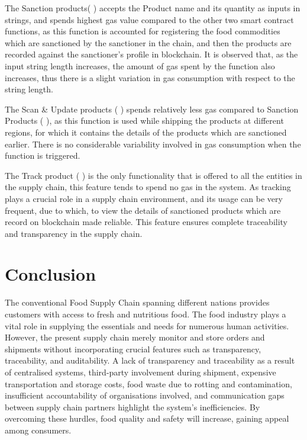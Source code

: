 \documentclass[12pt,a4paper,twocolumn,fleqn]{article}
\begin{document}
The Sanction products( ) accepts the Product name and its quantity as inputs in strings, and spends highest gas value compared to the other two smart contract functions, as this function is accounted for registering the food commodities which are sanctioned by the sanctioner in the chain,  and then the products are recorded against the sanctioner’s profile in blockchain. It is observed that, as the input string length increases, the amount of gas spent by the function also increases, thus there is a slight variation in gas consumption with respect to the string length. 

The Scan \& Update products ( ) spends relatively less gas compared to Sanction Products ( ), as this function is used while shipping the products at different regions, for which it contains the details of the products which are sanctioned earlier. There is no considerable variability involved in gas consumption when the function is triggered.

The Track product ( ) is the only functionality that is offered to all the entities in the supply chain, this feature tends to spend no gas in the system. As tracking plays a crucial role in a supply chain environment, and its usage can be very frequent, due to which, to view the details of sanctioned products which are record on blockchain made reliable. This feature ensures complete traceability and transparency in the supply chain.
\newpage
  \pagestyle{fancy}
  \thispagestyle{empty}
  \thispagestyle{plain}
  \fancyhf{}
  \chead{}
  \renewcommand{\headrulewidth}{0.4pt}%
\renewcommand{\footrulewidth}{0.4pt}%
\normalsize
\section*{Conclusion} 

The conventional Food Supply Chain spanning different nations provides customers with access to fresh and nutritious food. The food industry plays a vital role in supplying the essentials and needs for numerous human activities. However, the present supply chain merely monitor and store orders and shipments without incorporating crucial features such as transparency, traceability, and auditability. A lack of transparency and traceability as a result of centralised systems, third-party involvement during shipment, expensive transportation and storage costs, food waste due to rotting and contamination, insufficient accountability of organisations involved, and communication gaps between supply chain partners highlight the system's inefficiencies. By overcoming these hurdles, food quality and safety will increase, gaining appeal among consumers. \\
\end{document}
